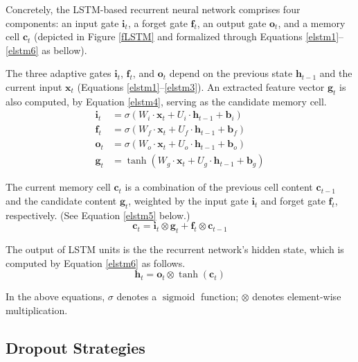 \documentclass[11pt,a4paper]{article}
\begin{document}
Concretely, the LSTM-based recurrent neural network
comprises four components: an input gate ${\bm i_t}$, a forget gate ${\bm f_t}$, an output gate ${\bm o_t}$, and a memory cell ${\bm c_t}$ (depicted in Figure \ref{fLSTM} and formalized through
Equations \ref{elstm1}--\ref{elstm6} as bellow).

The three adaptive gates $\bm i_t$, $\bm f_t$, and $\bm o_t$
depend on the previous state $\bm h_{t-1}$ and the current input $\bm x_t$
(Equations \ref{elstm1}--\ref{elstm3}).
An extracted feature vector $\bm g_t$ is also computed, by Equation \ref{elstm4},
serving as the candidate memory cell.
\begin{align}
\bm i_t &= \sigma(W_i\!\cdot\!\bm x_t+U_i\!\cdot\!\bm h_{t-1}+\bm b_i)        \label{elstm1}\\
\bm f_t &= \sigma(W_f\!\cdot\!\bm x_t+U_f\!\cdot\!\bm h_{t-1}+\bm b_f)        \label{elstm2}\\
\bm o_t &= \sigma(W_o\!\cdot\!\bm x_t+U_o\!\cdot\!\bm h_{t-1}+\bm b_o)        \label{elstm3}\\
\bm g_t &= \tanh(W_g\cdot\!\bm x_t+U_g\!\cdot\!\bm h_{t-1}+\bm  b_g)     \label{elstm4}
\end{align}



The current memory cell $\bm c_t$ is a  combination of
the previous cell content $\bm c_{t-1}$ and the candidate content $\bm g_{t}$,
weighted by the input gate $\bm i_t$ and forget gate $\bm f_t$, respectively.
(See Equation \ref{elstm5} below.)
\begin{equation}
\bm c_t =\bm i_t\otimes\bm g_t+\bm f_t\otimes\bm c_{t-1}    \label{elstm5}
\end{equation}


The output of LSTM units is the the recurrent network's hidden state, which
is computed by Equation \ref{elstm6} as follows.
\begin{equation}
\bm h_t =\bm o_t\otimes\tanh(\bm c_t)\label{elstm6}
\end{equation}

In the above equations,  $\sigma$ denotes a $\operatorname{sigmoid}$ function;
$\otimes$ denotes element-wise multiplication.





\subsection{Dropout Strategies}\label{ssDropout}
\end{document}
